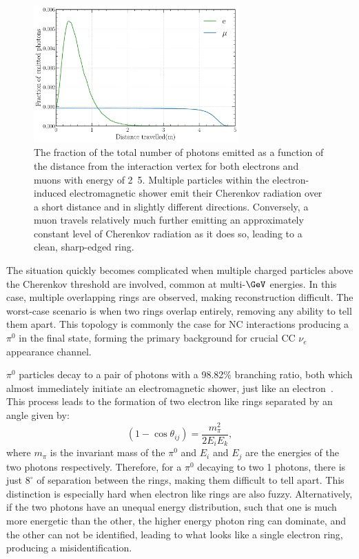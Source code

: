 \begin{figure} %
    \includegraphics[width=0.7\textwidth]{diagrams/4-chips/emission_distance.pdf}
    \caption[Fraction of Cherenkov photons emitted as a function of distance]
    {The fraction of the total number of photons emitted as a function of the distance from the
        interaction vertex for both electrons and muons with energy of \unit{2.5}{\GeV}. Multiple
        particles within the electron-induced electromagnetic shower emit their Cherenkov
        radiation over a short distance and in slightly different directions. Conversely, a muon
        travels relatively much further emitting an approximately constant level of Cherenkov
        radiation as it does so, leading to a clean, sharp-edged ring.}
    \label{fig:emission distance}
\end{figure}

The situation quickly becomes complicated when multiple charged particles above the Cherenkov
threshold are involved, common at multi-$\GeV$ energies. In this case, multiple overlapping rings
are observed, making reconstruction difficult. The worst-case scenario is when two rings overlap
entirely, removing any ability to tell them apart. This topology is commonly the case for NC
interactions producing a $\pi^{0}$ in the final state, forming the primary background for crucial
CC $\nu_{e}$ appearance channel.

$\pi^{0}$ particles decay to a pair of photons with a 98.82\% branching ratio, both which almost
immediately initiate an electromagnetic shower, just like an electron~\cite{particle2020}. This
process leads to the formation of two electron like rings separated by an angle given by:
\begin{equation}
    (1-\cos\theta_{ij})=\frac{m_{\pi}^2}{2E_{i}E_{k}},
\end{equation}
where $m_{\pi}$ is the invariant mass of the $\pi^{0}$ and $E_{i}$ and $E_{j}$ are the energies of
the two photons respectively. Therefore, for a $\pi^{0}$ decaying to two \unit{1}{\GeV} photons,
there is just $8^{\circ}$ of separation between the rings, making them difficult to tell apart.
This distinction is especially hard when electron like rings are also fuzzy. Alternatively, if the
two photons have an unequal energy distribution, such that one is much more energetic than the
other, the higher energy photon ring can dominate, and the other can not be identified, leading to
what looks like a single electron ring, producing a misidentification.

